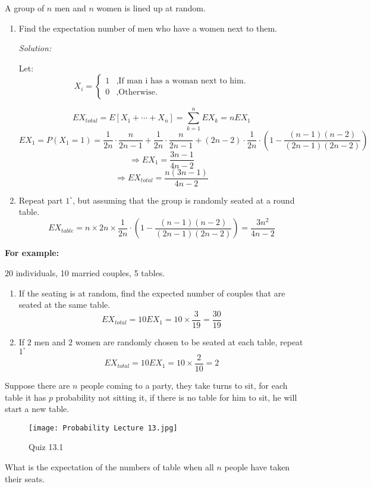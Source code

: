 \documentclass{article}
\begin{document}
A group of $n$ men and $n$ women is lined up at random.
\begin{enumerate}
    \item Find the expectation number of men who have a women next to them.
    
    \emph{Solution:}

    Let:
    \[ X_{i} = \begin{cases}
        1 &, \text{If man i has a woman next to him.}\\
        0 &, \text{Otherwise.}
    \end{cases} \]

    \[ EX_{total} = E[X_{1} + \cdots + X_{n}] = \sum_{k=1}^{n}EX_{k} = nEX_{1} \]
    \[EX_{1} = P(X_{1} = 1) = \frac{1}{2n} \cdot \frac{n}{2n-1} + \frac{1}{2n} \cdot \frac{n}{2n-1}+ (2n - 2) \cdot \frac{1}{2n} \cdot (1- \frac{(n-1)(n-2)}{(2n-1)(2n-2)})\]
    \[ \Rightarrow EX_{1} = \frac{3n-1}{4n-2} \]
    \[\Rightarrow EX_{total} = \frac{n(3n-1)}{4n-2} \]

    \item Repeat part $1^{\circ}$, but assuming that the group is randomly seated at a round table.
    \[ EX_{table} = n \times 2n \times \frac{1}{2n} \cdot (1 - \frac{(n-1)(n-2)}{(2n-1)(2n-2)}) = \frac{3n^{2}}{4n-2} \]
\end{enumerate}


\textbf{For example: }

    $20$ individuals, 10 married couples, 5 tables.
    \begin{enumerate}
    \item If the seating is at random, find the expected number of couples that are seated at the same table.
          \[ EX_{total} = 10EX_{1} = 10 \times \frac{3}{19} = \frac{30}{19}\]
    \item If $2$ men and $2$ women are randomly chosen to be seated at each table, repeat $1^{\circ}$
          \[ EX_{total} = 10EX_{1} = 10 \times \frac{2}{10} = 2\]
    \end{enumerate}


\begin{quiz}
   Suppose there are $n$ people coming to a party, they take turns to sit, for each table it has $p$ probability not sitting it, if there is no table for him to sit, he will start a new table.
   \begin{figure}[H]
       \centering
       \texttt{[image: Probability Lecture 13.jpg]}
       \caption{Quiz 13.1}
   \end{figure}
   What is the expectation of the numbers of table when all $n$ people have taken their seats.
\end{quiz}
\end{document}
